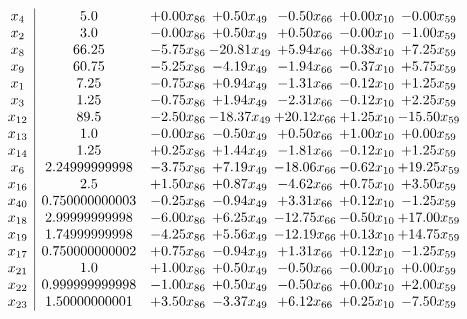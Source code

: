 \documentclass[8pt]{article}
\begin{document}
\[\begin{array}{c| c c@{\hskip 2pt} c@{\hskip 2pt} c@{\hskip 2pt} c@{\hskip 2pt} c@{\hskip 2pt} }
 x_{4}   &  5.0 & +  0.00 x_{86} & +  0.50 x_{49} & -0.50 x_{66} & +  0.00 x_{10} & -0.00 x_{59}\\
 x_{2}   &  3.0 & -0.00 x_{86} & +  0.50 x_{49} & +  0.50 x_{66} & -0.00 x_{10} & -1.00 x_{59}\\
 x_{8}   &  66.25 & -5.75 x_{86} & -20.81 x_{49} & +  5.94 x_{66} & +  0.38 x_{10} & +  7.25 x_{59}\\
 x_{9}   &  60.75 & -5.25 x_{86} & -4.19 x_{49} & -1.94 x_{66} & -0.37 x_{10} & +  5.75 x_{59}\\
 x_{1}   &  7.25 & -0.75 x_{86} & +  0.94 x_{49} & -1.31 x_{66} & -0.12 x_{10} & +  1.25 x_{59}\\
 x_{3}   &  1.25 & -0.75 x_{86} & +  1.94 x_{49} & -2.31 x_{66} & -0.12 x_{10} & +  2.25 x_{59}\\
 x_{12}   &  89.5 & -2.50 x_{86} & -18.37 x_{49} & + 20.12 x_{66} & +  1.25 x_{10} & -15.50 x_{59}\\
 x_{13}   &  1.0 & -0.00 x_{86} & -0.50 x_{49} & +  0.50 x_{66} & +  1.00 x_{10} & +  0.00 x_{59}\\
 x_{14}   &  1.25 & +  0.25 x_{86} & +  1.44 x_{49} & -1.81 x_{66} & -0.12 x_{10} & +  1.25 x_{59}\\
 x_{6}   &  2.24999999998 & -3.75 x_{86} & +  7.19 x_{49} & -18.06 x_{66} & -0.62 x_{10} & + 19.25 x_{59}\\
 x_{16}   &  2.5 & +  1.50 x_{86} & +  0.87 x_{49} & -4.62 x_{66} & +  0.75 x_{10} & +  3.50 x_{59}\\
 x_{40}   &  0.750000000003 & -0.25 x_{86} & -0.94 x_{49} & +  3.31 x_{66} & +  0.12 x_{10} & -1.25 x_{59}\\
 x_{18}   &  2.99999999998 & -6.00 x_{86} & +  6.25 x_{49} & -12.75 x_{66} & -0.50 x_{10} & + 17.00 x_{59}\\
 x_{19}   &  1.74999999998 & -4.25 x_{86} & +  5.56 x_{49} & -12.19 x_{66} & +  0.13 x_{10} & + 14.75 x_{59}\\
 x_{17}   &  0.750000000002 & +  0.75 x_{86} & -0.94 x_{49} & +  1.31 x_{66} & +  0.12 x_{10} & -1.25 x_{59}\\
 x_{21}   &  1.0 & +  1.00 x_{86} & +  0.50 x_{49} & -0.50 x_{66} & -0.00 x_{10} & +  0.00 x_{59}\\
 x_{22}   &  0.999999999998 & -1.00 x_{86} & +  0.50 x_{49} & -0.50 x_{66} & +  0.00 x_{10} & +  2.00 x_{59}\\
 x_{23}   &  1.50000000001 & +  3.50 x_{86} & -3.37 x_{49} & +  6.12 x_{66} & +  0.25 x_{10} & -7.50 x_{59}\\

\end{array}\]
\end{document}
